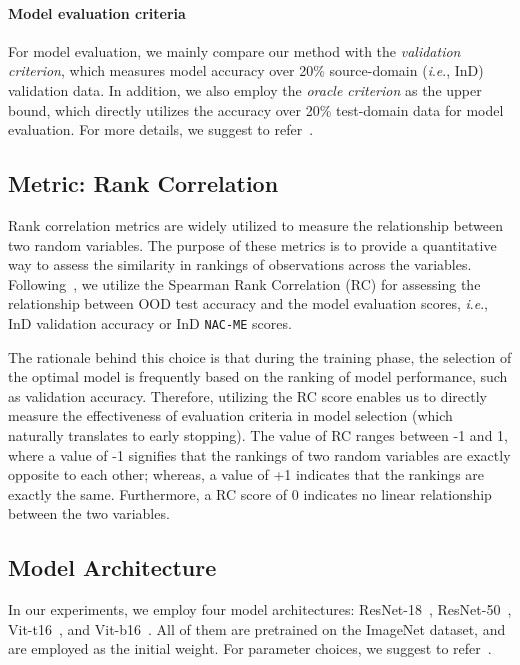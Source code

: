 \documentclass{article} \usepackage{iclr2024_conference,times}
\newcommand{\ie}{\textit{i}.\textit{e}.}
\begin{document}
\paragraph{Model evaluation criteria}
For model evaluation, we mainly compare our method with the \textit{validation criterion}, which measures model accuracy over 20\% source-domain (\ie, InD) validation data.
In addition, we also employ the \textit{oracle criterion} as the upper bound, which directly utilizes the accuracy over 20\% test-domain data for model evaluation. For more details, we suggest to refer~\cite{Setup:DomainBed}.

\subsection{Metric: Rank Correlation}
Rank correlation metrics are widely utilized to measure the relationship between two random variables.
The purpose of these metrics is to provide a quantitative way to assess the similarity in rankings of observations across the variables.
Following~\cite{Criterion:SMA}, we utilize the Spearman Rank Correlation (RC) for assessing the relationship between OOD test accuracy and the model evaluation scores, \ie, InD validation accuracy or InD \texttt{NAC-ME} scores. 

The rationale behind this choice is that during the training phase, the selection of the optimal model is frequently based on the ranking of model performance, such as validation accuracy. Therefore, utilizing the RC score enables us to directly measure the effectiveness of evaluation criteria in model selection (which naturally translates to early stopping). 
The value of RC ranges between -1 and 1, where a value of -1 signifies that the rankings of two random variables are exactly opposite to each other; whereas, a value of +1 indicates that the rankings are exactly the same.
Furthermore, a RC score of 0 indicates no linear relationship between the two variables. 







\subsection{Model Architecture}
In our experiments, we employ four model architectures: ResNet-18~\citep{tech:ResNet}, ResNet-50~\citep{tech:ResNet}, Vit-t16~\citep{tech:ViT}, and Vit-b16~\citep{tech:ViT}. All of them are pretrained on the ImageNet dataset, and are employed as the initial weight. 
For parameter choices, we suggest to refer~\cite{tech:swad}. 
\end{document}
